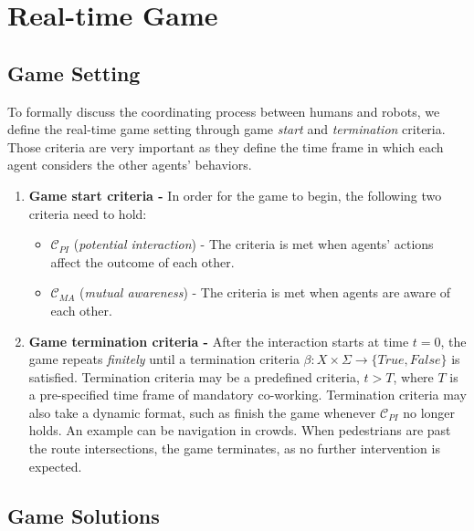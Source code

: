 \documentclass[letterpaper, 10 pt, conference]{ieeeconf}  %
\begin{document}
\vspace{-.3em}
\section{Real-time Game}\label{sec:realtime_game}
\vspace{-.2em}
\subsection{Game Setting}
To formally discuss the coordinating process between humans and robots, we 
define the real-time game setting through game \textit{start} and \textit{termination} criteria. Those criteria are very important as they define the time frame in which each agent considers the other agents' behaviors.

\begin{enumerate}
	\item \textbf{Game start criteria -} In order for the game to begin, the following two 
    criteria need to hold:
	\begin{itemize}
		\item $\mathcal{C}_{PI}$ (\textit{potential interaction}) - The criteria 
      is met when agents' actions affect the outcome of each other.
		\item $\mathcal{C}_{MA}$ (\textit{mutual awareness}) - The criteria is met when agents are aware of each other.
	\end{itemize} 
	\item \textbf{Game termination criteria -} After the interaction starts at time 
    $t=0$, the game repeats \textit{finitely} until a termination criteria 
    $\beta: X \times \Sigma \rightarrow \{True,False\}$ is satisfied. 
    Termination criteria may be a predefined criteria, $t>T$, where $T$ is a 
    pre-specified time frame of mandatory co-working. Termination criteria may 
    also take a dynamic format, such as finish the game whenever 
    $\mathcal{C}_{PI}$ no longer holds. An example can be navigation in 
    crowds. When pedestrians are past the route intersections, the game terminates, as no further intervention is expected.
\end{enumerate}


\subsection{Game Solutions}
\end{document}
